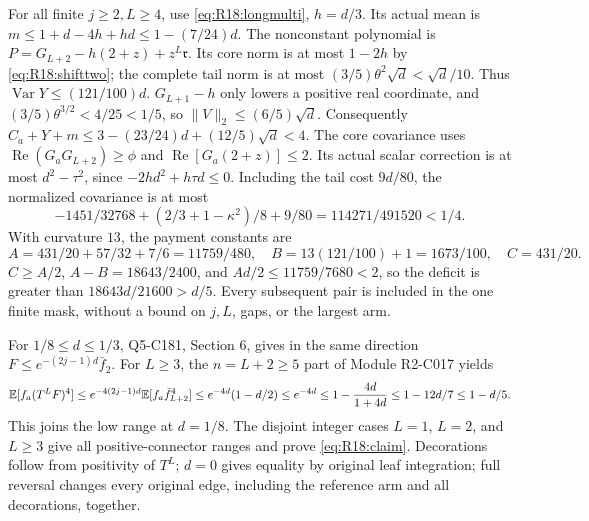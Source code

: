 For all finite $j\ge2,L\ge4$, use \eqref{eq:R18:longmulti}, $h=d/3$.
Its actual mean is $m\le1+d-4h+hd\le1-(7/24)d$.
The nonconstant polynomial is
$P=G_{L+2}-h(2+z)+z^L\mathfrak r$.
Its core norm is at most $1-2h$ by \eqref{eq:R18:shifttwo}; the
complete tail norm is at most $(3/5)\theta^2\sqrt d<\sqrt d/10$.
Thus $\operatorname{Var}Y\le(121/100)d$.
$G_{L+1}-h$ only lowers a positive real coordinate, and
$(3/5)\theta^{3/2}<4/25<1/5$, so $\|V\|_2\le(6/5)\sqrt d$.
Consequently $C_a+Y+m\le3-(23/24)d+(12/5)\sqrt d<4$.
The core covariance uses
$\operatorname{Re}(G_aG_{L+2})\ge\phi$ and
$\operatorname{Re}[G_a(2+z)]\le2$.
Its actual scalar correction is at most $d^2-\tau^2$, since
$-2hd^2+h\tau d\le0$.
Including the tail cost $9d/80$, the normalized covariance is at most
\[
-1451/32768+(2/3+1-\kappa^2)/8+9/80
=114271/491520<1/4.
\]
With curvature $13$, the payment constants are
\[
A=431/20+57/32+7/6=11759/480,\quad
B=13(121/100)+1=1673/100,\quad C=431/20.
\]
$C\ge A/2$, $A-B=18643/2400$, and $Ad/2\le11759/7680<2$,
so the deficit is greater than $18643d/21600>d/5$.
Every subsequent pair is included in the one finite mask, without a
bound on $j,L$, gaps, or the largest arm.

For $1/8\le d\le1/3$, Q5-C181, Section 6, gives in the same direction
$F\le e^{-(2j-1)d}\bar f_2$.
For $L\ge3$, the $n=L+2\ge5$ part of Module R2-C017 yields
\[
\mathbb E[f_a(T^LF)^4]\le e^{-4(2j-1)d}\mathbb E[f_a\bar f_{L+2}^4]
\le e^{-4d}(1-d/2)\le e^{-4d}
\le1-\frac{4d}{1+4d}\le1-12d/7\le1-d/5.
\]
This joins the low range at $d=1/8$. The disjoint integer cases
$L=1$, $L=2$, and $L\ge3$ give all positive-connector ranges and prove
\eqref{eq:R18:claim}. Decorations follow from positivity of $T^L$;
$d=0$ gives equality by original leaf integration; full reversal
changes every original edge, including the reference arm and all
decorations, together.

